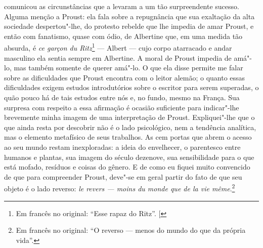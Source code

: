 comunicou as circunstâncias que a levaram a um tão surpreendente
sucesso. Alguma menção a Proust: ela fala sobre a repugnância que sua
exaltação da alta sociedade despertou"-lhe, do protesto rebelde que
lhe impedia de amar Proust, e então com fanatismo, quase com ódio, de
Albertine que, em uma medida tão absurda, é \emph{ce garçon du Ritz}\footnote{Em francês no original: ``Esse rapaz do Ritz''. {[}\versal{N.~T.}{]}}
--- Albert --- cujo corpo atarracado e andar masculino ela sentia sempre
em Albertine. A moral de Proust impedia de amá"-lo, mas também somente de
querer amá"-lo. O que ela disse permite me falar sobre as dificuldades
que Proust encontra com o leitor alemão; o quanto essas dificuldades
exigem estudos introdutórios sobre o escritor para serem superadas, o
quão pouco há de tais estudos entre nós e, no fundo, mesmo na França. Sua
surpresa com respeito a essa afirmação é ocasião suficiente para
indicar"-lhe brevemente minha imagem de uma interpretação de Proust.
Expliquei"-lhe que o que ainda resta por descobrir não é o lado
psicológico, nem a tendência analítica, mas o elemento metafísico de
seus trabalhos. As cem portas que abrem o acesso ao seu mundo restam
inexploradas: a ideia do envelhecer, o parentesco entre humanos e
plantas, sua imagem do século dezenove, sua sensibilidade para o que
está mofado, resíduos e coisas do gênero. E de como eu fiquei muito
convencido de que para compreender Proust, deve"-se em geral partir do
fato de que seu objeto é o lado reverso: \emph{le revers --- moins du
monde que de la vie même}.\footnote{Em francês no original: ``O reverso --- menos do mundo do que da própria vida''. \versal{[N.~T.]}}

